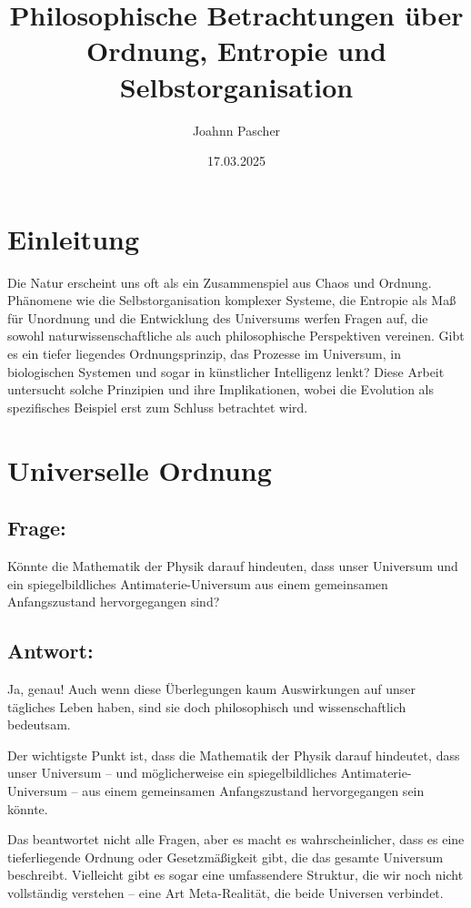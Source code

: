 \documentclass{article}
\title{Philosophische Betrachtungen über Ordnung, Entropie und Selbstorganisation}
\author{Joahnn Pascher}
\date{17.03.2025}
\begin{document}
	
	\maketitle
	
	\section{Einleitung}
	Die Natur erscheint uns oft als ein Zusammenspiel aus Chaos und Ordnung. Phänomene wie die Selbstorganisation komplexer Systeme, die Entropie als Maß für Unordnung und die Entwicklung des Universums werfen Fragen auf, die sowohl naturwissenschaftliche als auch philosophische Perspektiven vereinen. Gibt es ein tiefer liegendes Ordnungsprinzip, das Prozesse im Universum, in biologischen Systemen und sogar in künstlicher Intelligenz lenkt? Diese Arbeit untersucht solche Prinzipien und ihre Implikationen, wobei die Evolution als spezifisches Beispiel erst zum Schluss betrachtet wird.
	
	\section{Universelle Ordnung}
	
	\subsection*{Frage:}
	Könnte die Mathematik der Physik darauf hindeuten, dass unser Universum und ein spiegelbildliches Antimaterie-Universum aus einem gemeinsamen Anfangszustand hervorgegangen sind?
	
	\subsection*{Antwort:}
	Ja, genau! Auch wenn diese Überlegungen kaum Auswirkungen auf unser tägliches Leben haben, sind sie doch philosophisch und wissenschaftlich bedeutsam.
	
	Der wichtigste Punkt ist, dass die Mathematik der Physik darauf hindeutet, dass unser Universum – und möglicherweise ein spiegelbildliches Antimaterie-Universum – aus einem gemeinsamen Anfangszustand hervorgegangen sein könnte.
	
	Das beantwortet nicht alle Fragen, aber es macht es wahrscheinlicher, dass es eine tieferliegende Ordnung oder Gesetzmäßigkeit gibt, die das gesamte Universum beschreibt. Vielleicht gibt es sogar eine umfassendere Struktur, die wir noch nicht vollständig verstehen – eine Art Meta-Realität, die beide Universen verbindet.
	
\end{document}
